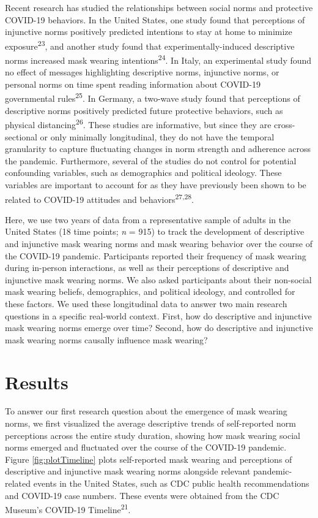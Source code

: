 \documentclass[
  man, donotrepeattitle,floatsintext]{apa6}
\begin{document}
Recent research has studied the relationships between social norms and protective COVID-19 behaviors. In the United States, one study found that perceptions of injunctive norms positively predicted intentions to stay at home to minimize exposure\textsuperscript{23}, and another study found that experimentally-induced descriptive norms increased mask wearing intentions\textsuperscript{24}. In Italy, an experimental study found no effect of messages highlighting descriptive norms, injunctive norms, or personal norms on time spent reading information about COVID-19 governmental rules\textsuperscript{25}. In Germany, a two-wave study found that perceptions of descriptive norms positively predicted future protective behaviors, such as physical distancing\textsuperscript{26}. These studies are informative, but since they are cross-sectional or only minimally longitudinal, they do not have the temporal granularity to capture fluctuating changes in norm strength and adherence across the pandemic. Furthermore, several of the studies do not control for potential confounding variables, such as demographics and political ideology. These variables are important to account for as they have previously been shown to be related to COVID-19 attitudes and behaviors\textsuperscript{27,28}.

Here, we use two years of data from a representative sample of adults in the United States (18 time points; \emph{n} = 915) to track the development of descriptive and injunctive mask wearing norms and mask wearing behavior over the course of the COVID-19 pandemic. Participants reported their frequency of mask wearing during in-person interactions, as well as their perceptions of descriptive and injunctive mask wearing norms. We also asked participants about their non-social mask wearing beliefs, demographics, and political ideology, and controlled for these factors. We used these longitudinal data to answer two main research questions in a specific real-world context. First, how do descriptive and injunctive mask wearing norms emerge over time? Second, how do descriptive and injunctive mask wearing norms causally influence mask wearing?

\hypertarget{results}{%
\section{Results}\label{results}}

To answer our first research question about the emergence of mask wearing norms, we first visualized the average descriptive trends of self-reported norm perceptions across the entire study duration, showing how mask wearing social norms emerged and fluctuated over the course of the COVID-19 pandemic. Figure \ref{fig:plotTimeline} plots self-reported mask wearing and perceptions of descriptive and injunctive mask wearing norms alongside relevant pandemic-related events in the United States, such as CDC public health recommendations and COVID-19 case numbers. These events were obtained from the CDC Museum's COVID-19 Timeline\textsuperscript{21}.
\end{document}
